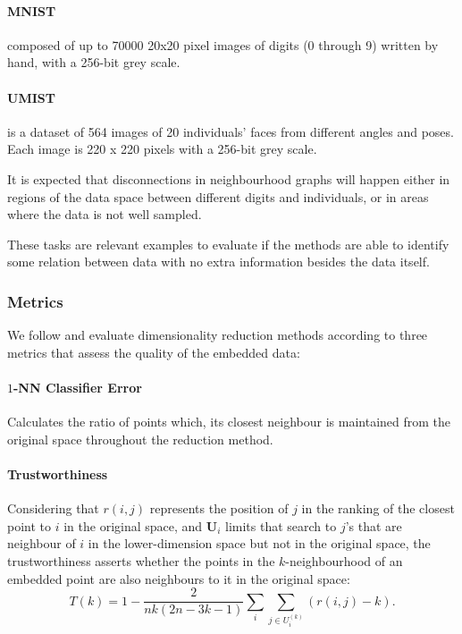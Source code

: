 \paragraph{MNIST} composed of up to 70000 20x20 pixel images of digits (0 through 9) written by hand, with a 256-bit grey scale.

\paragraph{UMIST} is a dataset of 564 images of 20 individuals' faces from different angles and poses. Each image is 220 x 220 pixels with a 256-bit grey scale.

It is expected that disconnections in neighbourhood graphs will happen either in regions of the data space between different digits and individuals, or in areas where the data is not well sampled.

These tasks are relevant examples to evaluate if the methods are able to identify some relation between data with no extra information besides the data itself.

\subsubsection{Metrics}
We follow \cite{comparison} and evaluate dimensionality reduction methods according to three metrics that assess the quality of the embedded data:

\paragraph{$1$-NN Classifier Error} \cite{1-nn} Calculates the ratio of points which, its closest neighbour is maintained from the original space throughout the reduction method.

\paragraph{Trustworthiness} \cite{t&c} Considering that $r(i,j)$ represents the position of $j$ in the ranking of the closest point to $i$ in the original space, and $\bm{U}_i$ limits that search to $j$'s that are neighbour of $i$ in the lower-dimension space but not in the original space, the trustworthiness asserts whether the points in the $k$-neighbourhood of an embedded point are also neighbours to it in the original space:
\begin{equation}
    T(k) = 1 - \frac{2}{nk(2n-3k-1)} \sum_i \sum_{j\in U_i^{(k)}} (r(i,j) - k).
\end{equation}


